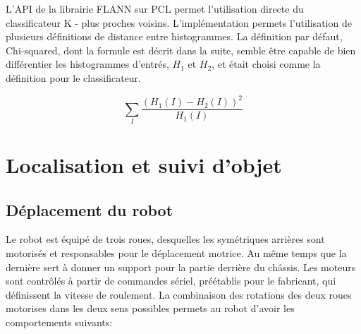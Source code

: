 L'API de la librairie FLANN sur PCL permet l'utilisation directe du classificateur
K - plus proches voisins. L'implémentation permets l'utilisation de plusieurs
définitions de distance entre histogrammes. La définition par défaut, Chi-squared,
dont la formule est décrit dans la suite, semble être capable de bien différentier
les histogrammes d'entrés, $H_1$ et $H_2$, et était choisi comme la définition pour le classificateur.

$$\sum _I \frac{\left(H_1(I)-H_2(I)\right)^2}{H_1(I)} $$







\section{Localisation et suivi d'objet}

\subsection{Déplacement du robot}

Le robot est équipé de trois roues, desquelles les symétriques
arrières sont motorisés et responsables pour le déplacement
motrice. Au même temps que la dernière sert à donner un support pour
la partie derrière du châssis. Les moteurs sont contrôlés à
partir de commandes sériel, préétablis pour le fabricant, qui
définissent la vitesse de roulement. La combinaison des rotations
des deux roues motorises dans les deux sens possibles permets au
robot d'avoir les comportements suivants:

